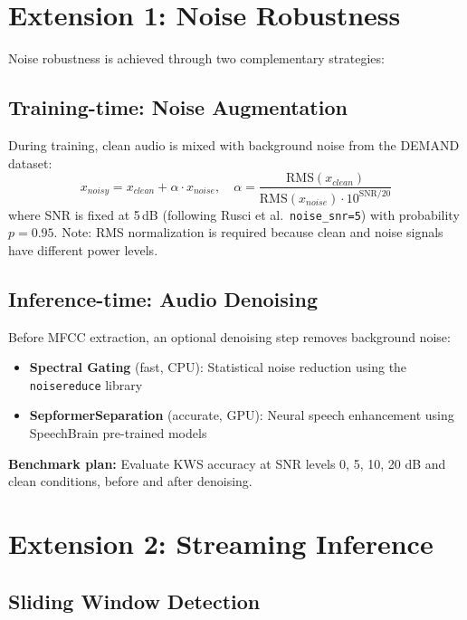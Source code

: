 \documentclass[12pt,a4paper]{report}
\begin{document}
\section{Extension 1: Noise Robustness}

Noise robustness is achieved through two complementary strategies:

\subsection{Training-time: Noise Augmentation}

During training, clean audio is mixed with background noise from the DEMAND
dataset:
\begin{equation}
    x_{noisy} = x_{clean} + \alpha \cdot x_{noise}, \quad
    \alpha = \frac{\text{RMS}(x_{clean})}{\text{RMS}(x_{noise}) \cdot 10^{\text{SNR}/20}}
\end{equation}
where SNR is fixed at 5\,dB (following Rusci et al.\ \texttt{noise\_snr=5}) with probability $p = 0.95$.
Note: RMS normalization is required because clean and noise signals have different power levels.

\subsection{Inference-time: Audio Denoising}

Before MFCC extraction, an optional denoising step removes background noise:

\begin{itemize}
    \item \textbf{Spectral Gating} (fast, CPU): Statistical noise reduction
          using the \texttt{noisereduce} library
    \item \textbf{SepformerSeparation} (accurate, GPU): Neural speech
          enhancement using SpeechBrain pre-trained models
\end{itemize}

\textbf{Benchmark plan:} Evaluate KWS accuracy at SNR levels 0, 5, 10, 20 dB
and clean conditions, before and after denoising.


\section{Extension 2: Streaming Inference}

\subsection{Sliding Window Detection}
\end{document}
